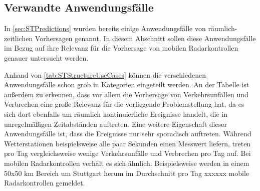 \subsection{Verwandte Anwendungsfälle}
\label{sec:VerwandteAnwendungsfaelle}
In \autoref{sec:STPredictions} wurden bereits einige Anwendungsfälle von räumlich-zeitlichen Vorhersagen genannt.
In diesem Abschnitt sollen diese Anwendungsfälle im Bezug auf ihre Relevanz für die Vorhersage von mobilen Radarkontrollen genauer untersucht werden.

Anhand von \autoref{tab:STStructureUseCases} können die verschiedenen Anwendungsfälle schon grob in Kategorien eingeteilt werden.
An der Tabelle ist außerdem zu erkennen, dass vor allem die Vorhersage von Verkehrsunfällen und Verbrechen eine große Relevanz für die vorliegende Problemstellung hat, da es sich dort ebenfalls um räumlich kontinuierliche Ereignisse handelt, die in unregelmäßigen Zeitabständen auftreten.
Eine weitere Eigenschaft dieser Anwendungsfälle ist, dass die Ereignisse nur sehr sporadisch auftreten.
Während Wetterstationen beispielsweise alle paar Sekunden einen Messwert liefern, treten pro Tag vergleichsweise wenige Verkehrsunfälle und Verbrechen pro Tag auf.
Bei mobilen Radarkontrollen verhält es sich ähnlich.
Beispielsweise werden in einem 50x50 km Bereich um Stuttgart herum im Durchschnitt pro Tag xxxxxx mobile Radarkontrollen gemeldet.



